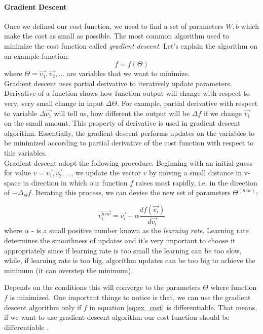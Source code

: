 \paragraph{Gradient Descent} \label{par:grad_desc}Once we defined our cost function, we need to find
a set of parameters $W, b$ which make the cost as small as possible. The most common
algorithm used to minimize the cost function called \emph{gradient descent}.
Let's explain the algorithm on an example function:
\begin{equation} \label{eq:ex_cost}
	f = f(\Theta)
\end{equation}
where $\Theta = \vec{v_1}, \vec{v_2},...$ are variables that we want to minimize.
\\
Gradient descent uses partial derivative
to iteratively update parameters. Derivative of a function shows how function output
will change with respect to very, very small change in input $\Delta \Theta $.
For example, partial derivative with respect to variable $\Delta{\vec{v_1}}$ will tell us, how different
the output will be $\Delta f $ if we change $\vec{v_1}$ on the small amount.
This property of derivative is used in gradient descent algorithm.
Essentially, the gradient descent
performs updates on the variables to be minimized according to partial derivative of the
cost function with respect to this variables. \\
Gradient descent adopt the following procedure.
Beginning with an initial guess for value $v= \vec{v_1}, \vec{v_2}, ...$, we update the vector $v$
by moving a small distance in v-space in direction in which our function $f$ raises
most rapidly, i.e. in the direction of $- \Delta_{\Theta} f $. Iterating this process,
we can devise the new set of parameters $\Theta^{(new)}$:

\begin{equation} \label{eq:gd_update}
	\vec{v_i^{new}} = \vec{v_i} - \alpha \frac{df(\vec{v_i})}{d\vec{v_i}}
\end{equation}
where $\alpha$ - is a small positive number known as the \emph{learning rate}.
Learning rate determines the smoothness of updates and it's very important to choose
it appropriately since if learning rate is too small the learning can be too slow, while, if
learning rate is too big, algorithm updates can be too big to achieve the minimum
(it can overstep the minimum).

Depends on the conditions this will converge to the parameters $\Theta$ where function
$f$ is minimized.
One important things to notice is that, we can use the gradient descent algorithm only
if $f$ in equation \ref{eq:ex_cost} is differentiable. That means, if we want
to use gradient descent algorithm our cost function should
be differentiable \cite{Bishop1995}.


